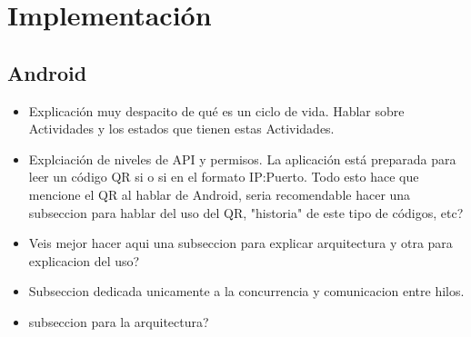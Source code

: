 %
%
%
%
%
%
%
%
%
%

\chapter{Implementaci\'on}
\label{cap5}
\label{cap:implementacion}


\section{Android}

\begin {itemize}
\item Explicaci\'on muy despacito de qu\'e es un ciclo de vida. Hablar sobre Actividades y los estados que tienen estas Actividades.
\item Explciaci\'on de niveles de API y permisos. La aplicaci\'on est\'a preparada para leer un c\'odigo QR si o si en el formato IP:Puerto. Todo esto hace que mencione el QR al hablar de Android, seria recomendable hacer una subseccion para hablar del uso del QR, "historia" de este tipo de c\'odigos, etc?
\item Veis mejor hacer aqui una subseccion para explicar arquitectura y otra para explicacion del uso?
\item Subseccion dedicada unicamente a la concurrencia y comunicacion entre hilos.
\item subseccion para la arquitectura?
\end {itemize}


